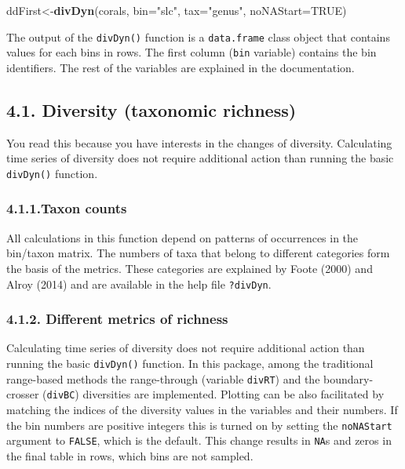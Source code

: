 \documentclass[]{article}
\newenvironment{Shaded}{\begin{snugshade}}{\end{snugshade}}
\newcommand{\DataTypeTok}[1]{\textcolor[rgb]{0.13,0.29,0.53}{#1}}
\newcommand{\KeywordTok}[1]{\textcolor[rgb]{0.13,0.29,0.53}{\textbf{#1}}}
\newcommand{\NormalTok}[1]{#1}
\newcommand{\OtherTok}[1]{\textcolor[rgb]{0.56,0.35,0.01}{#1}}
\newcommand{\StringTok}[1]{\textcolor[rgb]{0.31,0.60,0.02}{#1}}
\begin{document}
\begin{Shaded}
\begin{Highlighting}[]
\NormalTok{ddFirst<-}\KeywordTok{divDyn}\NormalTok{(corals, }\DataTypeTok{bin=}\StringTok{"slc"}\NormalTok{, }\DataTypeTok{tax=}\StringTok{"genus"}\NormalTok{, }\DataTypeTok{noNAStart=}\OtherTok{TRUE}\NormalTok{)}
\end{Highlighting}
\end{Shaded}

The output of the \texttt{divDyn()} function is a \texttt{data.frame}
class object that contains values for each bins in rows. The first
column (\texttt{bin} variable) contains the bin identifiers. The rest of
the variables are explained in the documentation.

\hypertarget{diversity-taxonomic-richness}{%
\subsection{4.1. Diversity (taxonomic
richness)}\label{diversity-taxonomic-richness}}

You read this because you have interests in the changes of diversity.
Calculating time series of diversity does not require additional action
than running the basic \texttt{divDyn()} function.

\hypertarget{taxon-counts}{%
\subsubsection{4.1.1.Taxon counts}\label{taxon-counts}}

All calculations in this function depend on patterns of occurrences in
the bin/taxon matrix. The numbers of taxa that belong to different
categories form the basis of the metrics. These categories are explained
by Foote (2000) and Alroy (2014) and are available in the help file
\texttt{?divDyn}.

\hypertarget{different-metrics-of-richness}{%
\subsubsection{4.1.2. Different metrics of
richness}\label{different-metrics-of-richness}}

Calculating time series of diversity does not require additional action
than running the basic \texttt{divDyn()} function. In this package,
among the traditional range-based methods the range-through (variable
\texttt{divRT}) and the boundary-crosser (\texttt{divBC}) diversities
are implemented. Plotting can be also facilitated by matching the
indices of the diversity values in the variables and their numbers. If
the bin numbers are positive integers this is turned on by setting the
\texttt{noNAStart} argument to \texttt{FALSE}, which is the default.
This change results in \texttt{NA}s and zeros in the final table in
rows, which bins are not sampled.
\end{document}
